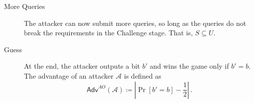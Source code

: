 \documentclass[twocolumn]{autart}
\theoremstyle{definition}
\theoremstyle{remark}
\begin{document}
\begin{description}
\begin{equation*}
    \end{equation*}
    \item[More Queries] The attacker can now submit more queries, so long as the queries do not break the requirements in the Challenge stage. That is, $S \subseteq U$.
    \item[Guess] At the end, the attacker outputs a bit $b'$ and wins the game only if $b' = b$. The advantage of an attacker $\mathcal{A}$ is defined as
    \begin{equation*}
        \mathsf{Adv}^{AO}(\mathcal{A}) \coloneqq \left\lvert \Pr [b'=b] - \frac{1}{2}\right\rvert\,.
    \end{equation*} 
\end{description}
\end{document}
